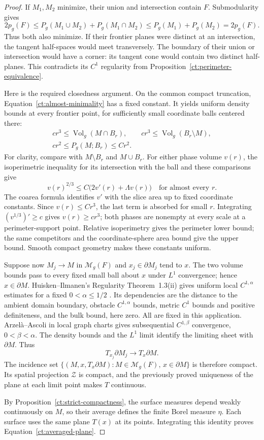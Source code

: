 \begin{proof}
If $M_1,M_2$ minimize, their union and intersection contain $F$.
Submodularity gives
\[
 2p_g(F)\leq P_g(M_1\cup M_2)+P_g(M_1\cap M_2)
 \leq P_g(M_1)+P_g(M_2)=2p_g(F).
\]
Thus both also minimize. If their frontier planes were distinct at
an intersection, the tangent half-spaces would meet transversely.
The boundary of their union or intersection would have a corner:
its tangent cone would contain two distinct half-planes. This
contradicts its $C^1$ regularity from
Proposition~\ref{ct:perimeter-equivalence}.

Here is the required closedness argument. On the common compact
truncation, Equation~\ref{ct:almost-minimality} has a fixed constant.
It yields uniform density bounds at every frontier point, for
sufficiently small coordinate balls centered there:
\begin{equation}
\label{ct:density-bounds}
 \begin{gathered}
 c r^3\leq\operatorname{Vol}_g(M\cap B_r),\qquad
 c r^3\leq\operatorname{Vol}_g(B_r\setminus M),\\
 c r^2\leq P_g(M;B_r)\leq C r^2.
 \end{gathered}
\end{equation}
For clarity, compare with $M\setminus B_r$ and $M\cup B_r$.
For either phase volume $v(r)$, the isoperimetric inequality for its
intersection with the ball and these comparisons give
\[
 v(r)^{2/3}\leq C\bigl(2v'(r)+\Lambda v(r)\bigr)
 \quad\text{for almost every }r.
\]
The coarea formula identifies $v'$ with the slice area up to fixed
coordinate constants. Since $v(r)\leq Cr^3$, the last term is absorbed
for small $r$. Integrating $(v^{1/3})'\geq c$ gives $v(r)\geq cr^3$;
both phases are nonempty at every scale at a perimeter-support point.
Relative isoperimetry gives the perimeter lower bound; the same
competitors and the coordinate-sphere area bound give the upper bound.
Smooth compact geometry makes these constants uniform.

Suppose now $M_j\to M$ in $\mathcal M_g(F)$ and
$x_j\in\partial M_j$ tend to $x$. The two volume bounds pass to every
fixed small ball about $x$ under $L^1$ convergence; hence
$x\in\partial M$. Huisken--Ilmanen's Regularity Theorem~1.3(ii)
gives uniform local $C^{1,\alpha}$ estimates for a fixed
$0<\alpha\leq1/2$ \cite{HuiskenIlmanen2001}. Its dependencies are
the distance to the ambient domain boundary, obstacle
$C^{1,\alpha}$ bounds, metric $C^1$ bounds and positive definiteness,
and the bulk bound, here zero. All are fixed in this application.
Arzel\`a--Ascoli in local graph charts gives subsequential
$C^{1,\beta}$ convergence, $0<\beta<\alpha$. The density bounds and
the $L^1$ limit identify the limiting sheet with $\partial M$. Thus
\[
 T_{x_j}\partial M_j\longrightarrow T_x\partial M.
\]
The incidence set
$\{(M,x,T_x\partial M):M\in\mathcal M_g(F),\,x\in\partial M\}$
is therefore compact. Its spatial projection $\mathcal Z$ is compact,
and the previously proved uniqueness of the plane at each limit point
makes $T$ continuous.

By Proposition~\ref{ct:strict-compactness}, the surface measures
depend weakly continuously on $M$, so their average defines the
finite Borel measure $\eta$. Each surface uses the same plane $T(x)$
at its points. Integrating this identity proves
Equation~\ref{ct:averaged-plane}.
\end{proof}

